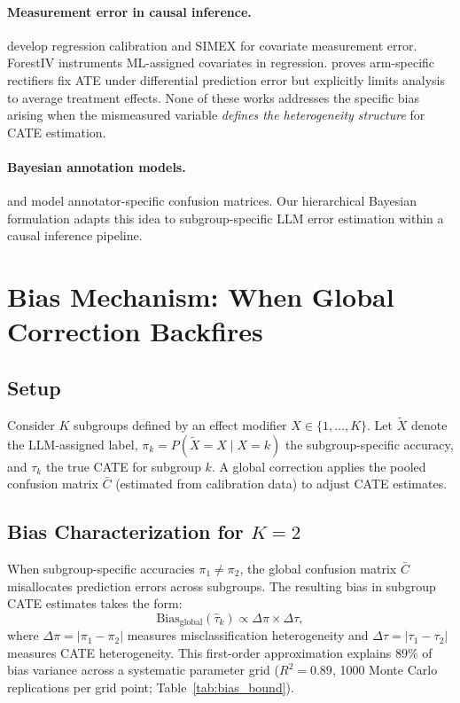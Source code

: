 \documentclass[11pt,a4paper]{article}
\begin{document}
\paragraph{Measurement error in causal inference.}
\citet{carroll2006measurement} develop regression calibration and SIMEX for covariate measurement error.
ForestIV \citep{bu2023estimating} instruments ML-assigned covariates in regression.
\citet{mozer2026adjusting} proves arm-specific rectifiers fix ATE under differential prediction error but explicitly limits analysis to average treatment effects.
None of these works addresses the specific bias arising when the mismeasured variable \emph{defines the heterogeneity structure} for CATE estimation.

\paragraph{Bayesian annotation models.}
\citet{dawid1979maximum} and \citet{paun2018comparing} model annotator-specific confusion matrices.
Our hierarchical Bayesian formulation adapts this idea to subgroup-specific LLM error estimation within a causal inference pipeline.

\section{Bias Mechanism: When Global Correction Backfires}
\label{sec:theory}

\subsection{Setup}

Consider $K$ subgroups defined by an effect modifier $X \in \{1, \ldots, K\}$.
Let $\tilde{X}$ denote the LLM-assigned label, $\pi_k = P(\tilde{X} = X \mid X = k)$ the subgroup-specific accuracy, and $\tau_k$ the true CATE for subgroup $k$.
A global correction applies the pooled confusion matrix $\bar{C}$ (estimated from calibration data) to adjust CATE estimates.

\subsection{Bias Characterization for $K=2$}

When subgroup-specific accuracies $\pi_1 \neq \pi_2$, the global confusion matrix $\bar{C}$ misallocates prediction errors across subgroups. The resulting bias in subgroup CATE estimates takes the form:
\begin{equation}
\text{Bias}_{\text{global}}(\hat{\tau}_k) \propto \Delta\pi \times \Delta\tau,
\label{eq:bias}
\end{equation}
where $\Delta\pi = |\pi_1 - \pi_2|$ measures misclassification heterogeneity and $\Delta\tau = |\tau_1 - \tau_2|$ measures CATE heterogeneity.
This first-order approximation explains 89\% of bias variance across a systematic parameter grid ($R^2 = 0.89$, 1000 Monte Carlo replications per grid point; Table~\ref{tab:bias_bound}).
\end{document}
